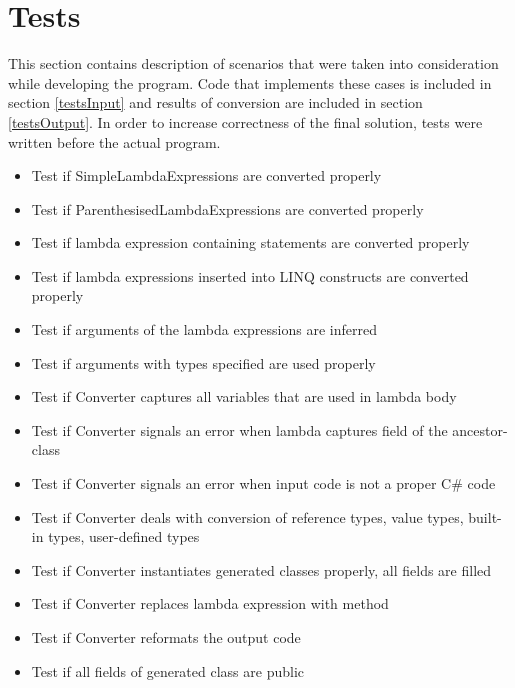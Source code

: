 \documentclass[]{report}
\begin{document}
    
    \section{Tests}
This section contains description of scenarios that were taken into consideration while developing the program. Code that implements these cases is included in section \ref{testsInput} and results of conversion are included in section \ref{testsOutput}. In order to increase correctness of the final solution, tests  were written before the actual program. 

     \begin{itemize}
         \item Test if SimpleLambdaExpressions are converted properly
         \item Test if ParenthesisedLambdaExpressions are converted properly
         \item Test if lambda expression containing statements are converted properly
         \item Test if lambda expressions inserted into LINQ constructs are converted properly
         \item Test if arguments of the lambda expressions are inferred
         \item Test if arguments with types specified are used properly
         \item Test if Converter captures all variables that are  used in lambda body
        \item Test if Converter signals an error when lambda captures field of the ancestor-class
        \item Test if Converter signals an error when input code is not a proper C\# code
        \item Test if Converter deals with conversion of reference types, value types, built-in types, user-defined  types
        \item Test if Converter instantiates generated classes properly, all fields are filled
        \item Test if Converter replaces lambda expression with method
        \item Test if Converter reformats the output code
        \item Test if all fields of generated class are public
        
        \end{itemize}
     

    
    
\end{document}
